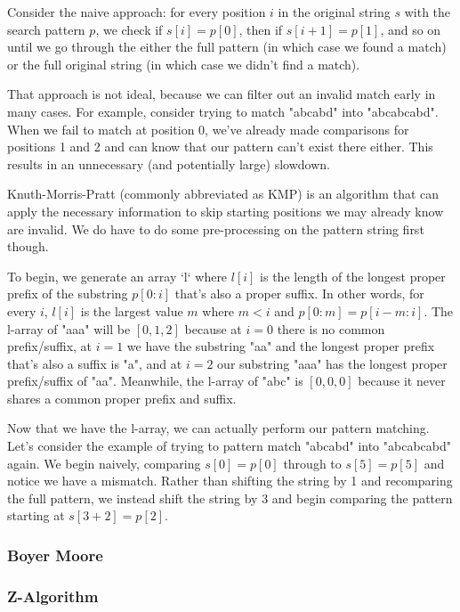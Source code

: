 Consider the naive approach: for every position $i$ in the original string $s$ with the search pattern $p$, we check if $s[i] = p[0]$, then if $s[i+1] = p[1]$, and so on until we go through the either the full pattern (in which case we found a match) or the full original string (in which case we didn't find a match).

That approach is not ideal, because we can filter out an invalid match early in many cases. For example, consider trying to match "abcabd" into "abcabcabd". When we fail to match at position 0, we've already made comparisons for positions 1 and 2 and can know that our pattern can't exist there either. This results in an unnecessary (and potentially large) slowdown.

Knuth-Morris-Pratt (commonly abbreviated as KMP) is an algorithm that can apply the necessary information to skip starting positions we may already know are invalid. We do have to do some pre-processing on the pattern string first though.

To begin, we generate an array `l` where $l[i]$ is the length of the longest proper prefix of the substring $p[0:i]$ that's also a proper suffix. In other words, for every $i$, $l[i]$ is the largest value $m$ where $m < i$ and $p[0:m] = p[i-m:i]$. The l-array of "aaa" will be $[0,1,2]$ because at $i=0$ there is no common prefix/suffix, at $i=1$ we have the substring "aa" and the longest proper prefix that's also a suffix is "a", and at $i=2$ our substring "aaa" has the longest proper prefix/suffix of "aa". Meanwhile, the l-array of "abc" is $[0,0,0]$ because it never shares a common proper prefix and suffix.

Now that we have the l-array, we can actually perform our pattern matching. Let's consider the example of trying to pattern match "abcabd" into "abcabcabd" again. We begin naively, comparing $s[0] = p[0]$ through to $s[5] = p[5]$ and notice we have a mismatch. Rather than shifting the string by 1 and recomparing the full pattern, we instead shift the string by 3 and begin comparing the pattern starting at $s[3+2] = p[2]$.

\subsubsection{Boyer Moore}

\subsubsection{Z-Algorithm}

